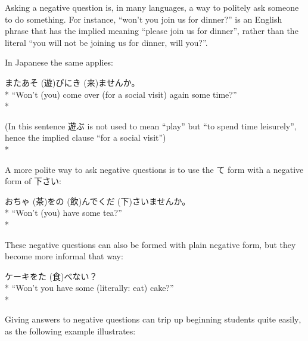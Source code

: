 \documentclass[11pt, b5paper, twoside, openright, onecolumn]{book}
\makeatletter
\newcommand*{\rubystack}[2]{{\relscale{0.5}%
  \begin{tabular}[b]{@{}c@{}}%
    {#1}\\%
   {\textscale{2}{#2}}%
  \end{tabular}}%
}
\DeclareRobustCommand*{\ruby}[2]{%
  \mbox{%
    \setlength{\parskip}{0ex}%
    \BeginAccSupp{method=pdfstringdef,ActualText={#1}}%
      \rubystack{\phantom{#2}}{#1}%
      \llap{%
        \rubystack{#2}{\phantom{#1}}%
      }%
    \EndAccSupp{}%
  }%
}
\renewcommand*{\ruby}[2]{#2 (#1)}%
\newenvironment{exampleblock}{
\setlength{\parindent}{0.6in}
\begin{minipage}[t]{\dimexpr\textwidth-\parindent}}
{\end{minipage}}
\makeatother
\begin{document}
Asking a negative question is‚ in many languages‚ a way to politely ask someone to do something. For instance‚ “won’t you join us for dinner?” is an English phrase that has the implied meaning “please join us for dinner”‚ rather than the literal “you will not be joining us for dinner‚ will you?”.

In Japanese the same applies:

\vspace{0.4cm}
\begin{exampleblock}
また\ruby{遊}{あそ}びに\ruby{来}{き}ませんか。 \\* 
“Won’t (you) come over (for a social visit) again some time?” \\* 
\end{exampleblock}
\vspace{0.2cm}

\begin{exampleblock}
(In this sentence 遊ぶ is not used to mean “play” but “to spend time leisurely”‚ hence the implied clause “for a social visit”) \\* 
\end{exampleblock}
\vspace{0.2cm}

A more polite way to ask negative questions is to use the て form with a negative form of 下さい:

\vspace{0.4cm}
\begin{exampleblock}
お\ruby{茶}{ちゃ}を\ruby{飲}{の}んで\ruby{下}{くだ}さいませんか。 \\* 
“Won’t (you) have some tea?” \\* 
\end{exampleblock}
\vspace{0.2cm}

These negative questions can also be formed with plain negative form‚ but they become more informal that way:

\vspace{0.4cm}
\begin{exampleblock}
ケーキを\ruby{食}{た}べない？ \\* 
“Won’t you have some (literally: eat) cake?” \\* 
\end{exampleblock}
\vspace{0.2cm}

Giving answers to negative questions can trip up beginning students quite easily‚ as the following example illustrates:
\end{document}
